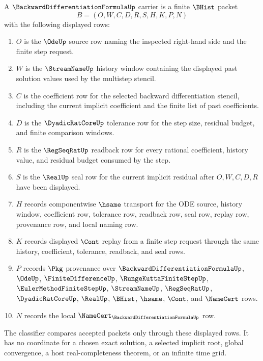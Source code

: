 \begin{definition}
\label{def:backward-differentiation-formula-carrier}
A $\BackwardDifferentiationFormulaUp$ carrier is a finite $\BHist$ packet
$$
B=(O,W,C,D,R,S,H,K,P,N)
$$
with the following displayed rows:
\begin{enumerate}
\item $O$ is the $\OdeUp$ source row naming the inspected right-hand side and the finite step request.
\item $W$ is the $\StreamNameUp$ history window containing the displayed past solution values used by the multistep stencil.
\item $C$ is the coefficient row for the selected backward differentiation stencil, including the current implicit coefficient and the finite list of past coefficients.
\item $D$ is the $\DyadicRatCoreUp$ tolerance row for the step size, residual budget, and finite comparison windows.
\item $R$ is the $\RegSeqRatUp$ readback row for every rational coefficient, history value, and residual budget consumed by the step.
\item $S$ is the $\RealUp$ seal row for the current implicit residual after $O,W,C,D,R$ have been displayed.
\item $H$ records componentwise $\hsame$ transport for the ODE source, history window, coefficient row, tolerance row, readback row, seal row, replay row, provenance row, and local naming row.
\item $K$ records displayed $\Cont$ replay from a finite step request through the same history, coefficient, tolerance, readback, and seal rows.
\item $P$ records $\Pkg$ provenance over $\BackwardDifferentiationFormulaUp$, $\OdeUp$, $\FiniteDifferenceUp$, $\RungeKuttaFiniteStepUp$, $\EulerMethodFiniteStepUp$, $\StreamNameUp$, $\RegSeqRatUp$, $\DyadicRatCoreUp$, $\RealUp$, $\BHist$, $\hsame$, $\Cont$, and $\NameCert$ rows.
\item $N$ records the local $\NameCert_{\BackwardDifferentiationFormulaUp}$ row.
\end{enumerate}
The classifier compares accepted packets only through these displayed rows. It has no coordinate for a chosen exact solution, a selected implicit root, global convergence, a host real-completeness theorem, or an infinite time grid.
\end{definition}

